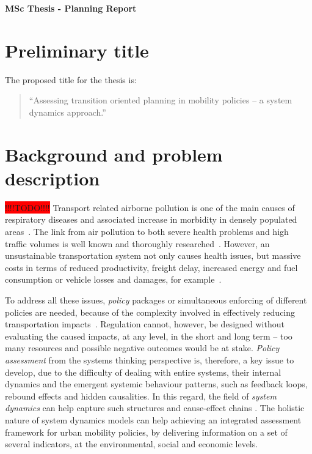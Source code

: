 \documentclass[a4paper,fontsize=10pt,bibliography=totoc]{scrartcl}
\newcommand{\titlemake}[1]{%
		\begin{center}
				\Large\sffamily\bfseries{#1}
		\end{center}
}
\begin{document}
\pagestyle{fancy}
\fancyhf{} %
\rhead{\footnotesize \today}
\rfoot{\footnotesize \thepage}

\titlemake{ %
MSc Thesis - Planning Report
}

\begin{multicols}{2}
\section{Preliminary title}
The proposed title for the thesis is:
%
\blockquote{``Assessing transition oriented planning in mobility policies -- a system dynamics approach.''}

\section{Background and problem description}
\label{s:background}
\colorbox{red}{!!!!TODO!!!!}
Transport related airborne pollution is one of the main causes of respiratory diseases and associated increase in morbidity in densely populated areas~\parencite{vimercati2011_Trafficrelatedair,who2006_Airqualityguidelines}. The link from air pollution to both severe health problems and high traffic volumes is well known and thoroughly researched~\parencite{who2006_Airqualityguidelines}. However, an unsustainable transportation system not only causes health issues, but massive costs in terms of reduced productivity, freight delay, increased energy and fuel consumption or vehicle losses and damages, for example~\parencite{li-zeng2012_SocialCostTraffic}.

To address all these issues, \textit{policy} packages or simultaneous enforcing of different policies are needed, because of the complexity involved in effectively reducing transportation impacts~\parencite[ch. 3, p. 45]{garciasierra2014_Travelbehaviourenvironmental}. Regulation cannot, however, be designed without evaluating the caused impacts, at any level, in the short and long term -- too many resources and possible negative outcomes would be at stake. \textit{Policy assessment} from the systems thinking perspective is, therefore, a key issue to develop, due to the difficulty of dealing with entire systems, their internal dynamics and the emergent systemic behaviour patterns, such as feedback loops, rebound effects and hidden causalities. In this regard, the field of \textit{system dynamics} can help capture such structures and cause-effect chains \parencite{hjorth2006_Navigatingtowardssustainable}. The holistic nature of system dynamics models can help achieving an integrated assessment framework for urban mobility policies, by delivering information on a set of several indicators, at the environmental, social and economic levels.


\end{multicols}
\end{document}
